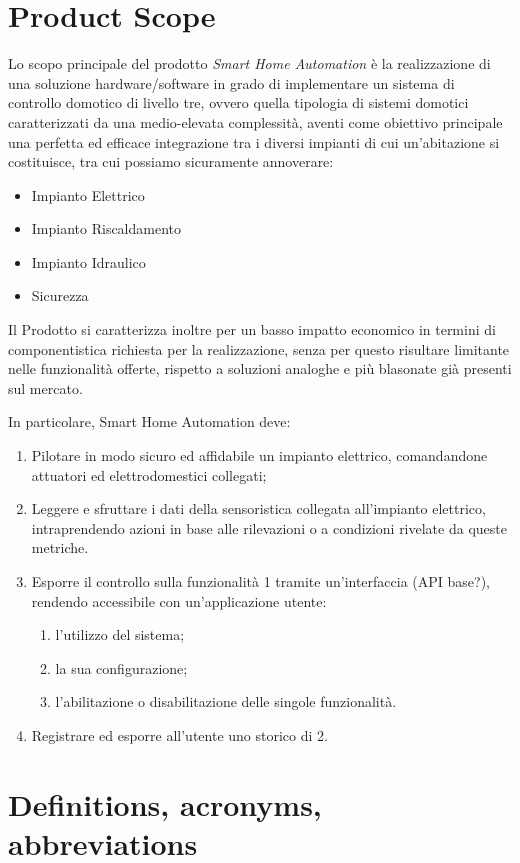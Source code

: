\documentclass[12pt,a4paper]{report}
\begin{document}
\section{Product Scope}
Lo scopo principale del prodotto \textit{Smart Home Automation} è la realizzazione di una soluzione hardware/software in grado di implementare un sistema di controllo domotico di livello tre, ovvero quella tipologia di sistemi domotici caratterizzati da una medio-elevata complessità, aventi come obiettivo principale una perfetta ed efficace integrazione tra i diversi impianti di cui un’abitazione si costituisce, tra cui possiamo sicuramente annoverare:
\begin{itemize}
\item Impianto Elettrico
\item Impianto Riscaldamento
\item Impianto Idraulico
\item Sicurezza
\end{itemize}
Il Prodotto si caratterizza inoltre per un basso impatto economico in termini di componentistica richiesta per la realizzazione, senza per questo risultare limitante nelle funzionalità offerte, rispetto a soluzioni analoghe e più blasonate già presenti sul mercato.

In particolare, Smart Home Automation deve:

\begin{enumerate}
\item Pilotare in modo sicuro ed affidabile un impianto elettrico, comandandone attuatori ed elettrodomestici collegati;
\item Leggere e sfruttare i dati della sensoristica collegata all’impianto elettrico, intraprendendo azioni in base alle rilevazioni o a condizioni rivelate da queste metriche.
\item Esporre il controllo sulla funzionalità 1 tramite un’interfaccia (API base?), rendendo accessibile con un’applicazione utente:
\begin{enumerate}
\item l’utilizzo del sistema;
\item la sua configurazione;
\item l’abilitazione o disabilitazione delle singole funzionalità.
\end{enumerate}
\item Registrare ed esporre all’utente uno storico di 2.
\end{enumerate}

\section{Definitions, acronyms, abbreviations}
\end{document}
